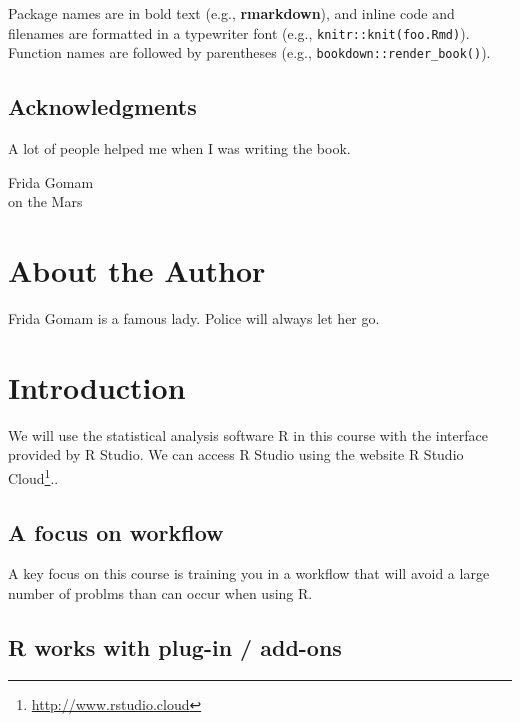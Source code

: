 \documentclass[
]{krantz}
\renewcommand{\href}[2]{#2\footnote{\url{#1}}}
\begin{document}
Package names are in bold text (e.g., \textbf{rmarkdown}), and inline code and filenames are formatted in a typewriter font (e.g., \texttt{knitr::knit(\textquotesingle{}foo.Rmd\textquotesingle{})}). Function names are followed by parentheses (e.g., \texttt{bookdown::render\_book()}).

\hypertarget{acknowledgments}{%
\section*{Acknowledgments}\label{acknowledgments}}


A lot of people helped me when I was writing the book.

\begin{flushright}
Frida Gomam\\
on the Mars
\end{flushright}

\hypertarget{about-the-author}{%
\chapter*{About the Author}\label{about-the-author}}


Frida Gomam is a famous lady. Police will always let her go.

\mainmatter

\hypertarget{introduction}{%
\chapter{Introduction}\label{introduction}}

We will use the statistical analysis software R in this course with the interface provided by R Studio. We can access R Studio using the website \href{http://www.rstudio.cloud}{R Studio Cloud}..

\hypertarget{a-focus-on-workflow}{%
\section{A focus on workflow}\label{a-focus-on-workflow}}

A key focus on this course is training you in a workflow that will avoid a large number of problms than can occur when using R.

\hypertarget{r-works-with-plug-in-add-ons}{%
\section{R works with plug-in / add-ons}\label{r-works-with-plug-in-add-ons}}
\end{document}
